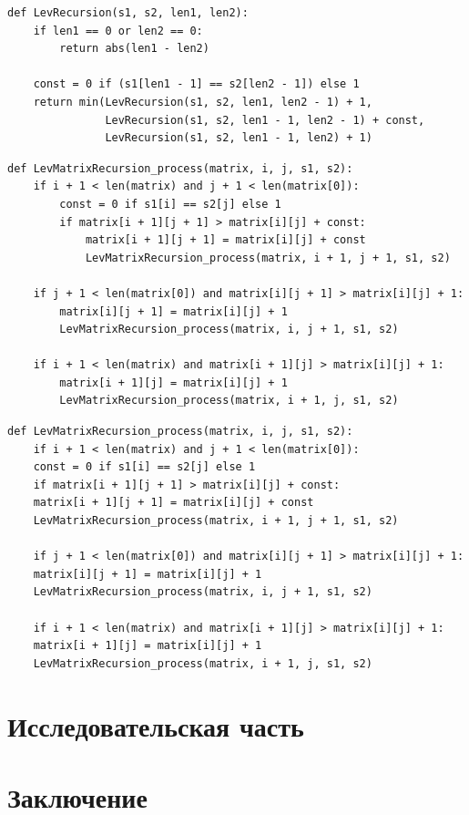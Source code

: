 \documentclass[12pt]{report}
\begin{document}
\begin{lstlisting}[label=some-code, caption = Расстояние Левенштейна - рекурсивный расчёт по формуле]
def LevRecursion(s1, s2, len1, len2):
	if len1 == 0 or len2 == 0:
		return abs(len1 - len2)
	
	const = 0 if (s1[len1 - 1] == s2[len2 - 1]) else 1
	return min(LevRecursion(s1, s2, len1, len2 - 1) + 1,
			   LevRecursion(s1, s2, len1 - 1, len2 - 1) + const,
			   LevRecursion(s1, s2, len1 - 1, len2) + 1)
\end{lstlisting}

\begin{lstlisting}[label=some-code, caption = Расстояние Левенштейна - алгоритм с рекурсией и матрицей]
def LevMatrixRecursion_process(matrix, i, j, s1, s2):
	if i + 1 < len(matrix) and j + 1 < len(matrix[0]):
		const = 0 if s1[i] == s2[j] else 1
		if matrix[i + 1][j + 1] > matrix[i][j] + const:
			matrix[i + 1][j + 1] = matrix[i][j] + const
			LevMatrixRecursion_process(matrix, i + 1, j + 1, s1, s2)
	
	if j + 1 < len(matrix[0]) and matrix[i][j + 1] > matrix[i][j] + 1:
		matrix[i][j + 1] = matrix[i][j] + 1
		LevMatrixRecursion_process(matrix, i, j + 1, s1, s2)
	
	if i + 1 < len(matrix) and matrix[i + 1][j] > matrix[i][j] + 1:
		matrix[i + 1][j] = matrix[i][j] + 1
		LevMatrixRecursion_process(matrix, i + 1, j, s1, s2)
\end{lstlisting}

\begin{lstlisting}[label=some-code, caption = Расстояние Дамерау-Левенштейна]
	def LevMatrixRecursion_process(matrix, i, j, s1, s2):
	if i + 1 < len(matrix) and j + 1 < len(matrix[0]):
	const = 0 if s1[i] == s2[j] else 1
	if matrix[i + 1][j + 1] > matrix[i][j] + const:
	matrix[i + 1][j + 1] = matrix[i][j] + const
	LevMatrixRecursion_process(matrix, i + 1, j + 1, s1, s2)
	
	if j + 1 < len(matrix[0]) and matrix[i][j + 1] > matrix[i][j] + 1:
	matrix[i][j + 1] = matrix[i][j] + 1
	LevMatrixRecursion_process(matrix, i, j + 1, s1, s2)
	
	if i + 1 < len(matrix) and matrix[i + 1][j] > matrix[i][j] + 1:
	matrix[i + 1][j] = matrix[i][j] + 1
	LevMatrixRecursion_process(matrix, i + 1, j, s1, s2)
\end{lstlisting}



\chapter{Исследовательская часть}
\chapter*{Заключение}
\end{document}
